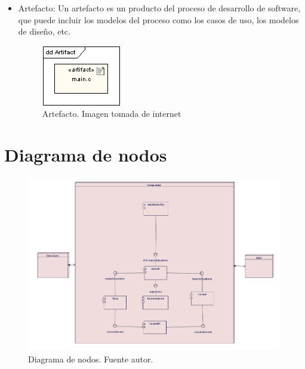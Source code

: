 \begin{itemize}
\item Artefacto: Un artefacto es un producto del proceso de desarrollo de software, que puede incluir los modelos del proceso como los casos de uso, los modelos de diseño, etc.

\begin{figure}[H]
	\centering
	\includegraphics[width=0.5\linewidth]{diseno/nodos/imgs/4}
	\caption{Artefacto. Imagen tomada de internet}
	\label{fig:gantt}
\end{figure}

\end{itemize}

\section{Diagrama de nodos}
\begin{figure}[H]
	\centering
	\includegraphics[width=0.8\linewidth]{diseno/nodos/imgs/nodos}
	\caption{Diagrama de nodos. Fuente autor.}
	\label{fig:gantt}
\end{figure}
